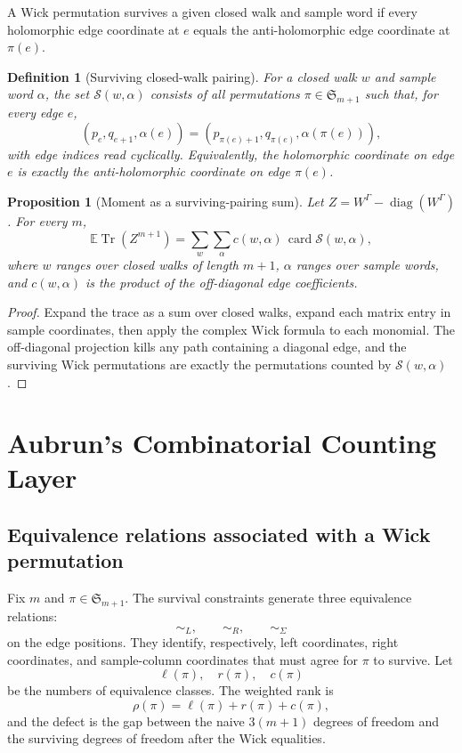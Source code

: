 \documentclass[11pt,oneside]{book}
\newtheorem{proposition}[theorem]{Proposition}
\newtheorem{definition}[theorem]{Definition}
\DeclareMathOperator{\Tr}{Tr}
\DeclareMathOperator{\diag}{diag}
\DeclareMathOperator{\card}{card}
\newcommand{\E}{\mathbb E}
\newcommand{\1}{\mathbf 1}
\newcommand{\pt}{\Gamma}
\begin{document}
A Wick permutation survives a given closed walk and sample word if every
holomorphic edge coordinate at \(e\) equals the anti-holomorphic edge
coordinate at \(\pi(e)\).

\begin{definition}[Surviving closed-walk pairing]
For a closed walk \(w\) and sample word \(\alpha\), the set
\(\mathcal S(w,\alpha)\) consists of all permutations \(\pi\in\mathfrak S_{m+1}\)
such that, for every edge \(e\),
\[
  (p_e,q_{e+1},\alpha(e))
  =
  (p_{\pi(e)+1},q_{\pi(e)},\alpha(\pi(e))),
\]
with edge indices read cyclically.  Equivalently, the holomorphic coordinate
on edge \(e\) is exactly the anti-holomorphic coordinate on edge \(\pi(e)\).
\end{definition}

\begin{proposition}[Moment as a surviving-pairing sum]
Let \(Z=W^\pt-\diag(W^\pt)\).  For every \(m\),
\[
  \E\Tr(Z^{m+1})
  =
  \sum_{w}\sum_{\alpha}
  c(w,\alpha)\,\card\mathcal S(w,\alpha),
\]
where \(w\) ranges over closed walks of length \(m+1\), \(\alpha\) ranges over
sample words, and \(c(w,\alpha)\) is the product of the off-diagonal edge
coefficients.
\end{proposition}

\begin{proof}
Expand the trace as a sum over closed walks, expand each matrix entry in
sample coordinates, then apply the complex Wick formula to each monomial.  The
off-diagonal projection kills any path containing a diagonal edge, and the
surviving Wick permutations are exactly the permutations counted by
\(\mathcal S(w,\alpha)\).
\end{proof}

\chapter{Aubrun's Combinatorial Counting Layer}

\section{Equivalence relations associated with a Wick permutation}

Fix \(m\) and \(\pi\in\mathfrak S_{m+1}\).  The survival constraints generate
three equivalence relations:
\[
  \sim_L,\qquad \sim_R,\qquad \sim_\Sigma
\]
on the edge positions.  They identify, respectively, left coordinates, right
coordinates, and sample-column coordinates that must agree for \(\pi\) to
survive.  Let
\[
  \ell(\pi),\quad r(\pi),\quad c(\pi)
\]
be the numbers of equivalence classes.  The weighted rank is
\[
  \rho(\pi)=\ell(\pi)+r(\pi)+c(\pi),
\]
and the defect is the gap between the naive \(3(m+1)\) degrees of freedom and
the surviving degrees of freedom after the Wick equalities.
\end{document}
